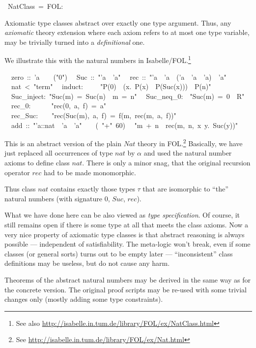 \begin{isabelle}%
%
\ NatClass\ =\ FOL:%
\begin{isamarkuptext}%
\medskip\noindent Axiomatic type classes abstract over exactly one
 type argument. Thus, any \emph{axiomatic} theory extension where each
 axiom refers to at most one type variable, may be trivially turned
 into a \emph{definitional} one.

 We illustrate this with the natural numbers in
 Isabelle/FOL.\footnote{See also
 \url{http://isabelle.in.tum.de/library/FOL/ex/NatClass.html}}%
\end{isamarkuptext}%
\isanewline
\ \ zero\ ::\ 'a\ \ \ \ ({"}0{"})\isanewline
\ \ Suc\ ::\ {"}'a\ {\isasymRightarrow}\ 'a{"}\isanewline
\ \ rec\ ::\ {"}'a\ {\isasymRightarrow}\ 'a\ {\isasymRightarrow}\ ('a\ {\isasymRightarrow}\ 'a\ {\isasymRightarrow}\ 'a)\ {\isasymRightarrow}\ 'a{"}\isanewline
\isanewline
{}\isanewline
\ \ nat\ <\ {"}term{"}\isanewline
\ \ induct:\ \ \ \ \ {"}P(0)\ {\isasymLongrightarrow}\ ({\isasymAnd}x.\ P(x)\ {\isasymLongrightarrow}\ P(Suc(x)))\ {\isasymLongrightarrow}\ P(n){"}\isanewline
\ \ Suc\_inject:\ {"}Suc(m)\ =\ Suc(n)\ {\isasymLongrightarrow}\ m\ =\ n{"}\isanewline
\ \ Suc\_neq\_0:\ \ {"}Suc(m)\ =\ 0\ {\isasymLongrightarrow}\ R{"}\isanewline
\ \ rec\_0:\ \ \ \ \ \ {"}rec(0,\ a,\ f)\ =\ a{"}\isanewline
\ \ rec\_Suc:\ \ \ \ {"}rec(Suc(m),\ a,\ f)\ =\ f(m,\ rec(m,\ a,\ f)){"}\isanewline
\isanewline
{}\isanewline
\ \ add\ ::\ {"}'a::nat\ {\isasymRightarrow}\ 'a\ {\isasymRightarrow}\ 'a{"}\ \ \ \ (\ {"}+{"}\ 60)\isanewline
\ \ {"}m\ +\ n\ {\isasymequiv}\ rec(m,\ n,\ {\isasymlambda}x\ y.\ Suc(y)){"}%
\begin{isamarkuptext}%
This is an abstract version of the plain $Nat$ theory in
 FOL.\footnote{See
 \url{http://isabelle.in.tum.de/library/FOL/ex/Nat.html}} Basically,
 we have just replaced all occurrences of type $nat$ by $\alpha$ and
 used the natural number axioms to define class $nat$.  There is only
 a minor snag, that the original recursion operator $rec$ had to be
 made monomorphic.

 Thus class $nat$ contains exactly those types $\tau$ that are
 isomorphic to ``the'' natural numbers (with signature $0$, $Suc$,
 $rec$).

 \medskip What we have done here can be also viewed as \emph{type
 specification}.  Of course, it still remains open if there is some
 type at all that meets the class axioms.  Now a very nice property of
 axiomatic type classes is that abstract reasoning is always possible
 --- independent of satisfiability.  The meta-logic won't break, even
 if some classes (or general sorts) turns out to be empty later ---
 ``inconsistent'' class definitions may be useless, but do not cause
 any harm.

 Theorems of the abstract natural numbers may be derived in the same
 way as for the concrete version.  The original proof scripts may be
 re-used with some trivial changes only (mostly adding some type
 constraints).%
\end{isamarkuptext}%
\end{isabelle}%
